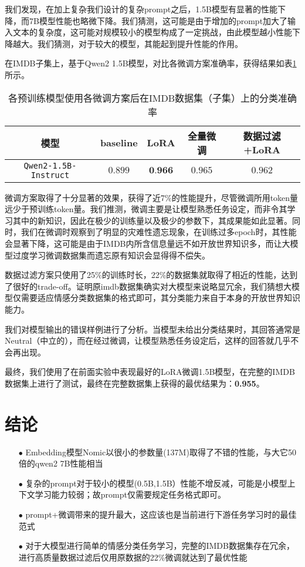 \documentclass{article}
\begin{document}
我们发现，在加上复杂我们设计的复杂prompt之后，1.5B模型有显著的性能下降，而7B模型性能也略微下降。我们猜测，这可能是由于增加的prompt加大了输入文本的复杂度，这可能对规模较小的模型构成了一定挑战，由此模型越小性能下降越大。我们猜测，对于较大的模型，其能起到提升性能的作用。

在IMDB子集上，基于Qwen2 1.5B模型，对比各微调方案准确率，获得结果如表\ref{tab:ft_results}所示。

\begin{table}[htbp]
  \caption{\small{各预训练模型使用各微调方案后在IMDB数据集（子集）上的分类准确率}}
  \label{tab:ft_results}
  \centering
  \begin{tabular}{ccccc}
    \toprule
    模型                    & baseline & LoRA             & 全量微调 & 数据过滤+LoRA \\
    \midrule
    \verb|Qwen2-1.5B-Instruct| & $0.899$  & $\textbf{0.966}$ & $0.965$  & $0.962$       \\
    \bottomrule
  \end{tabular}
\end{table}

微调方案取得了十分显著的效果，获得了近7\%的性能提升，尽管微调所用token量远少于预训练token量。我们推测，微调主要是让模型熟悉任务设定，而非令其学习其中的新知识，因此在极少的训练量以及极少的参数下，其成果能如此显著。同时，我们在微调时观察到了明显的灾难性遗忘现象，在训练过多epoch时，其性能会显著下降，这可能是由于IMDB内所含信息量远不如开放世界知识多，而让大模型过度学习微调数据集而遗忘原有知识会显得得不偿失。

数据过滤方案只使用了25\%的训练时长，22\%的数据集就取得了相近的性能，达到了很好的trade-off。证明原imdb数据集确实对大模型来说略显冗余，我们猜想大模型仅需要适应情感分类数据集的格式即可，其分类能力来自于本身的开放世界知识能力。

我们对模型输出的错误样例进行了分析。当模型未给出分类结果时，其回答通常是Neutral（中立的），而在经过微调，让模型熟悉任务设定后，这样的回答就几乎不会再出现。

最终，我们使用了在前面实验中表现最好的LoRA微调1.5B模型，在完整的IMDB数据集上进行了测试，最终在完整数据集上获得的最优结果为：\textbf{0.955}。

\section{结论}
\begin{itemize}
  \item[$\bullet$] Embedding模型Nomic以很小的参数量(137M)取得了不错的性能，与大它50倍的qwen2 7B性能相当
  \item[$\bullet$] 复杂的prompt对于较小的模型(0.5B,1.5B）性能不增反减，可能是小模型上下文学习能力较弱；故prompt仅需要规定任务格式即可。
  \item[$\bullet$] prompt+微调带来的提升最大，这应该也是当前进行下游任务学习时的最佳范式
  \item[$\bullet$] 对于大模型进行简单的情感分类任务学习，完整的IMDB数据集存在冗余，进行高质量数据过滤后仅用原数据的22\%微调就达到了最优性能
\end{itemize}
\end{document}
